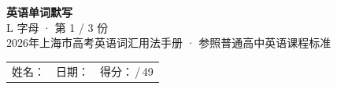 \documentclass[10pt,a4paper]{article}
\begin{document}
\pagestyle{plain}

\begin{center}
{\LARGE\bfseries 英语单词默写}\\[0.22em]
{\large L 字母 · 第 1 / 3 份}\\[0.18em]
{\small 2026年上海市高考英语词汇用法手册 · 参照普通高中英语课程标准}
\end{center}

\vspace{0.25em}
\noindent\begin{tabular}{@{}p{}@{}p{}@{}p{}@{}}
姓名：\underline{\hspace{2.0cm}} & 日期：\underline{\hspace{2.0cm}} & 得分：\underline{\hspace{1.3cm}}\,/\,49 \\
\end{tabular}

\vspace{0.3em}

\vspace{0.08em}
\end{document}
